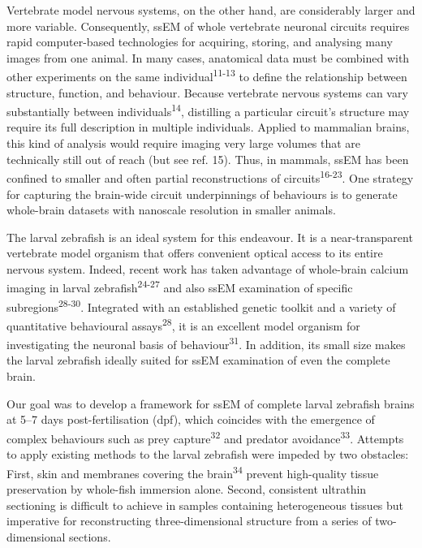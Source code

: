 \documentclass{article}
\begin{document}
Vertebrate model nervous systems, on the other hand, are considerably larger and more variable. Consequently, ssEM of whole vertebrate neuronal circuits requires rapid computer-based technologies for acquiring, storing, and analysing many images from one animal. In many cases, anatomical data must be combined with other experiments on the same individual\textsuperscript{11-13} to define the relationship between structure, function, and behaviour. Because vertebrate nervous systems can vary substantially between individuals\textsuperscript{14}, distilling a particular circuit’s structure may require its full description in multiple individuals. Applied to mammalian brains, this kind of analysis would require imaging very large volumes that are technically still out of reach (but see ref. 15). Thus, in mammals, ssEM has been confined to smaller and often partial reconstructions of circuits\textsuperscript{16-23}. One strategy for capturing the brain-wide circuit underpinnings of behaviours is to generate whole-brain datasets with nanoscale resolution in smaller animals.

The larval zebrafish is an ideal system for this endeavour. It is a near-transparent vertebrate model organism that offers convenient optical access to its entire nervous system. Indeed, recent work has taken advantage of whole-brain calcium imaging in larval zebrafish\textsuperscript{24-27} and also ssEM examination of specific subregions\textsuperscript{28-30}. Integrated with an established genetic toolkit and a variety of quantitative behavioural assays\textsuperscript{28}, it is an excellent model organism for
investigating the neuronal basis of behaviour\textsuperscript{31}. In addition, its small size makes the larval zebrafish ideally suited for ssEM examination of even the complete brain.

Our goal was to develop a framework for ssEM of complete larval zebrafish brains at 5–7 days post-fertilisation (dpf), which coincides with the emergence of complex behaviours such as prey capture\textsuperscript{32} and predator avoidance\textsuperscript{33}. Attempts to apply existing methods to the larval zebrafish were impeded by two obstacles: First, skin and membranes covering the brain\textsuperscript{34} prevent high-quality tissue preservation by whole-fish immersion alone. Second, consistent ultrathin sectioning is difficult to achieve in samples containing heterogeneous tissues but imperative for reconstructing three-dimensional structure from a series of two-dimensional sections.
\end{document}
